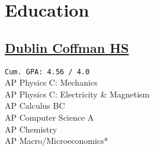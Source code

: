 \documentclass[]{farhan-resume-openfont}
\begin{document}
%
%
%
%

%
%

\begin{minipage}[t]{0.25\textwidth}

    \section{Education}

    \subsection{\href{https://www.dublinschools.net/Coffman}{Dublin Coffman HS}}
    \texttt{Cum. GPA: 4.56 / 4.0} \\
    AP Physics C: Mechanics \\
    AP Physics C: Electricity \& Magnetism \\
    AP Calculus BC \\
    AP Computer Science A\\
    AP Chemistry\\
    AP Macro/Microeconomics*\\
    \sectionsep

\end{minipage}
\end{document}
